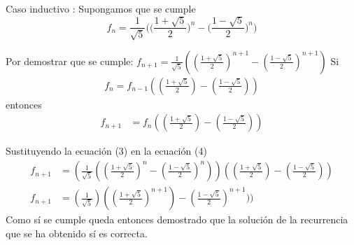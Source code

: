 \documentclass[letterpaper,11pt, fleqn]{article}
\begin{document}
Caso inductivo : Supongamos que se cumple
\begin{equation}
	f_{n} = \frac{1}{\sqrt{5}} \Biggl(\Biggl(\frac{1 + \sqrt{5}}{2}\Biggr)^{n} - \Biggl(\frac{1 - \sqrt{5}}{2}\Biggr)^{n}\Biggr)
\end{equation}

\qquad\qquad Por demostrar que se cumple: $f_{n+1} = \frac{1}{\sqrt{5}} ((\frac{1 + \sqrt{5}}{2})^{n+1} - (\frac{1 - \sqrt{5}}{2})^{n+1})$ \smallbreak
\qquad\qquad Si 
\begin{equation*}
\begin{aligned}
	f_{n} = f_{n-1} ((\frac{1+\sqrt{5}}{2}) - (\frac{1-\sqrt{5}}{2}))
\end{aligned}
\end{equation*}
\qquad \qquad entonces
\begin{equation}
\begin{aligned}
	f_{n+1} &= f_{n}((\frac{1+\sqrt{5}}{2}) - (\frac{1-\sqrt{5}}{2}))
\end{aligned}
\end{equation}

\qquad \qquad Sustituyendo la ecuación (3) en la ecuación (4)
\begin{equation*}
\begin{aligned}
	f_{n+1} &= (\frac{1}{\sqrt{5}} ((\frac{1 + \sqrt{5}}{2})^{n} - (\frac{1 - \sqrt{5}}{2})^{n}))((\frac{1+\sqrt{5}}{2}) - (\frac{1-\sqrt{5}}{2}))\\
	f_{n+1} &= (\frac{1}{\sqrt{5}}) ((\frac{1 + \sqrt{5}}{2})^{n+1}) - (\frac{1 - \sqrt{5}}{2})^{n+1}))
\end{aligned}
\end{equation*}
\qquad Como sí se cumple queda entonces demostrado que la solución de la recurrencia que se ha obtenido sí es correcta.
\end{document}
